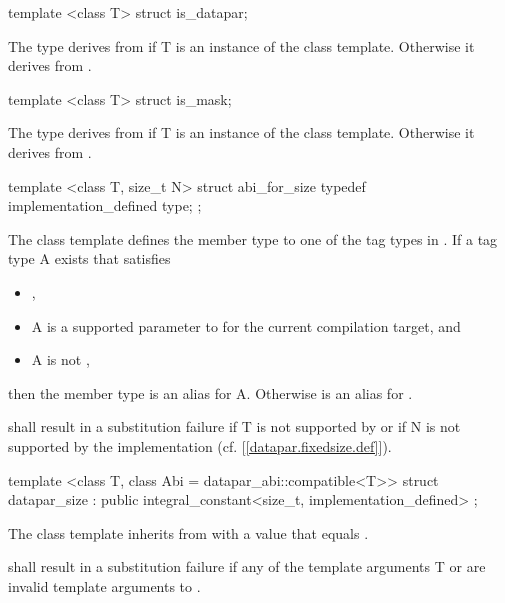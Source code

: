 \begin{itemdecl}
template <class T> struct is_datapar;
\end{itemdecl}
\begin{itemdescr}
  \pnum The  type derives from  if \type T is an instance of the \datapar class template.
  Otherwise it derives from .
\end{itemdescr}

\begin{itemdecl}
template <class T> struct is_mask;
\end{itemdecl}
\begin{itemdescr}
  \pnum The  type derives from  if \type T is an instance of the \mask class template.
  Otherwise it derives from .
\end{itemdescr}

\begin{itemdecl}
template <class T, size_t N> struct abi_for_size { typedef implementation_defined type; };
\end{itemdecl}
\begin{itemdescr}
  \pnum
  The  class template defines the member type  to one of the tag types in .
  If a tag type \type A exists that satisfies
  \begin{itemize}
    \item {},
    \item \type A is a supported  parameter to \datapar[<T, Abi>] for the current compilation target, and
    \item \type A is not \fixedsizeN,
  \end{itemize} then the member type  is an alias for \type A.
  Otherwise  is an alias for \fixedsizeN.

  \pnum {} shall result in a substitution failure if \type T is not supported by \datapar or if \code N is not supported by the implementation (cf. [\ref{datapar.fixedsize.def}]).
\end{itemdescr}

\begin{itemdecl}
template <class T, class Abi = datapar_abi::compatible<T>>
struct datapar_size : public integral_constant<size_t, implementation_defined> {};
\end{itemdecl}
\begin{itemdescr}
  \pnum The  class template inherits from  with a value that equals \datapar{}.

  \pnum {} shall result in a substitution failure if any of the template arguments \type T or  are invalid template arguments to \datapar.
\end{itemdescr}

